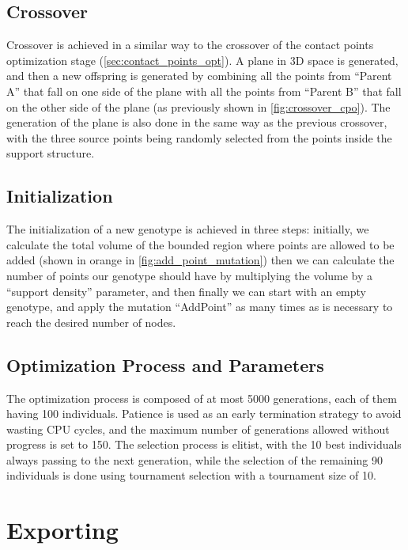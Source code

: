 \subsection{Crossover}
\label{sec:sup_struct_opt_cross}

Crossover is achieved in a similar way to the crossover of the contact points optimization stage (\cref{sec:contact_points_opt}).
A plane in 3D space is generated, and then a new offspring is generated by combining all the points from ``Parent A''
that fall on one side of the plane with all the points from ``Parent B'' that fall on the other side of the plane 
(as previously shown in \cref{fig:crossover_cpo}).
The generation of the plane is also done in the same way as the previous crossover, with the three source points being 
randomly selected from the points inside the support structure.

\subsection{Initialization}
\label{sec:sup_struct_opt_init}

The initialization of a new genotype is achieved in three steps: initially, we calculate the total volume
of the bounded region where points are allowed to be added (shown in orange in \cref{fig:add_point_mutation})
then we can calculate the number of points our genotype should have by multiplying the volume by a ``support density'' 
parameter, and then finally we can start with an empty genotype, and apply the mutation ``AddPoint'' as many times as is 
necessary to reach the desired number of nodes.

\subsection{Optimization Process and Parameters}
\label{sec:sup_struct_opt_par}

The optimization process is composed of at most 5000 generations,
each of them having 100 individuals. Patience is used as an early termination strategy to avoid wasting
CPU cycles, and the maximum number of generations allowed without progress is set to 150.
The selection process is elitist, with the 10 best individuals always passing to the next generation,
while the selection of the remaining 90 individuals is done using tournament selection with a 
tournament size of 10.

\section{Exporting}
\label{sec:exporting}

